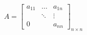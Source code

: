 \[  A = \begin{bmatrix}
  a_{11} & \dots & a_{1n} \\
   & \ddots & \vdots \\
  0 & & a_{nn}
\end{bmatrix}_{n\times n}  \]
